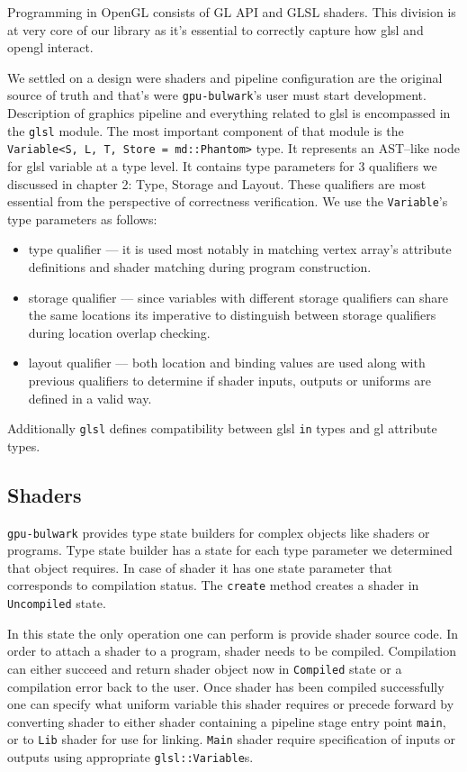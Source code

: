 Programming in OpenGL consists of GL API and GLSL shaders. This division is at very core of our library as it's essential to correctly capture how glsl and opengl interact.

We settled on a design were shaders and pipeline configuration are the original source of truth and that's were \texttt{gpu-bulwark}'s user must start development.
Description of graphics pipeline and everything related to glsl is encompassed in the \texttt{glsl} module.
The most important component of that module is the \texttt{Variable<S, L, T, Store = md::Phantom>} type.
It represents an AST--like node for glsl variable at a type level.
It contains type parameters for 3 qualifiers we discussed in chapter 2: Type, Storage and Layout. These qualifiers are most essential from the perspective of correctness verification.
We use the \texttt{Variable}'s type parameters as follows:
\begin{itemize}
    \item type qualifier --- it is used most notably in matching vertex array's attribute definitions and shader matching during program construction.
    \item storage qualifier --- since variables with different storage qualifiers can share the same locations its imperative to distinguish between storage qualifiers during location overlap checking.
    \item layout qualifier --- both location and binding values are used along with previous qualifiers to determine if shader inputs, outputs or uniforms are defined in a valid way.
\end{itemize}

Additionally \texttt{glsl} defines compatibility between glsl \texttt{in} types and gl attribute types.

\subsection{Shaders}

\texttt{gpu-bulwark} provides type state builders for complex objects like shaders or programs. Type state builder has a state for each type parameter we determined that object requires.
In case of shader it has one state parameter that corresponds to compilation status. The \texttt{create} method creates a shader in \texttt{Uncompiled} state.

In this state the only operation one can perform is provide shader source code. In order to attach a shader to a program, shader needs to be compiled. 
Compilation can either succeed and return shader object now in \texttt{Compiled} state or a compilation error back to the user.
Once shader has been compiled successfully one can specify what uniform variable this shader requires or precede forward by converting shader 
to either shader containing a pipeline stage entry point \texttt{main}, or to \texttt{Lib} shader for use for linking.
\texttt{Main} shader require specification of inputs or outputs using appropriate \texttt{glsl::Variable}s.

